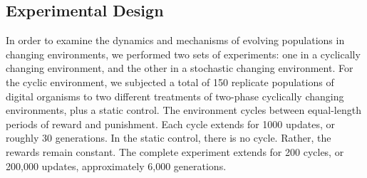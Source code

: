 \documentclass[letterpaper]{article}
\begin{document}
\subsection{Experimental Design}

In order to examine the dynamics and mechanisms of evolving populations in changing environments, we performed two sets of experiments: one in a cyclically changing environment, and the other in a stochastic changing environment.
For the cyclic environment,%
we subjected a total of 150 replicate populations of digital organisms to two different treatments of two-phase cyclically
changing environments, plus a static control. The environment cycles between equal-length periods of reward and punishment. Each cycle extends for 1000 updates, or roughly 30 generations. In the static control, there is no cycle. Rather, the rewards remain constant. The complete experiment extends for 200 cycles, or 200,000 updates, approximately 6,000 generations.
\end{document}
